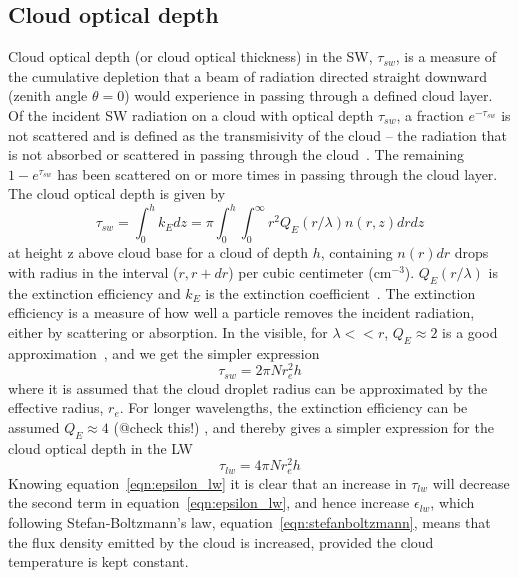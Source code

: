 \subsection{Cloud optical depth}
\label{sec:cloudoptdep}
Cloud optical depth (or cloud optical thickness) in the SW, $\tau_{sw}$, is a measure of the cumulative depletion that a beam of radiation directed straight downward (zenith angle $\theta = 0$) would experience in passing through a defined cloud layer. Of the incident SW radiation on a cloud with optical depth $\tau_{sw}$, a fraction $e^{-\tau_{sw}}$ is not scattered and is defined as the transmisivity of the cloud -- the radiation that is not absorbed or scattered in passing through the cloud~\citep{Wallace2006}. The remaining $1-e^{\tau_{sw}}$ has been scattered on or more times in passing through the cloud layer. The cloud optical depth is given by~\citep{Twomey1977}
\begin{equation}
\tau_{sw} = \int_0^h k_{E}dz = \pi \int_0^h \int_0^{\infty} r^2 Q_E(r/\lambda) n(r,z) dr dz
\end{equation}
at height z above cloud base for a cloud of depth $h$, containing $n(r)dr$ drops with radius in the interval ($r, r + dr$) per cubic centimeter ($\text{cm}^{-3}$). $Q_E(r/\lambda)$ is the extinction efficiency and $k_{E}$ is the extinction coefficient~\citep{Twomey1977}. The extinction efficiency is a measure of how well a particle removes the incident radiation, either by scattering or absorption. In the visible, for $\lambda<<r$, $Q_E\approx 2$ is a good approximation~\citep{Hobbs1993}, and we get the simpler expression
\begin{equation}
\tau_{sw} = 2\pi N r_e^2 h
\label{eqn:cloudtau_sw1}
\end{equation}
where it is assumed that the cloud droplet radius can be approximated by the effective radius, $r_e$.
For longer wavelengths, the extinction efficiency can be assumed $Q_E \approx 4$ (@check this!) , and thereby gives a simpler expression for the cloud optical depth in the LW
\begin{equation}
\tau_{lw} = 4\pi N r_e^2 h
\label{eqn:cloudtau_lw1}
\end{equation}
Knowing equation~\ref{eqn:epsilon_lw} it is clear that an increase in $\tau_{lw}$ will decrease the second term in equation~\ref{eqn:epsilon_lw}, and hence increase $\epsilon_{lw}$, which following Stefan-Boltzmann's law, equation~\ref{eqn:stefanboltzmann}, means that the flux density emitted by the cloud is increased, provided the cloud temperature is kept constant.

